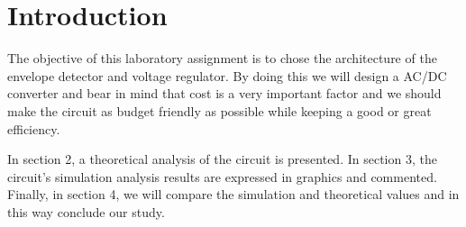 \section{Introduction}
\label{sec:introduction}



The objective of this laboratory assignment is to chose the architecture of the envelope detector and voltage regulator. By doing this we will design a AC/DC converter and bear in mind that cost is a very important factor and we should make the circuit as budget friendly as possible while keeping a good or great efficiency. 

In section 2, a theoretical analysis of the circuit is presented. In section 3, the circuit's simulation analysis results are expressed in graphics and commented. Finally, in section 4, we will compare the simulation and theoretical values and in this way conclude our study.


